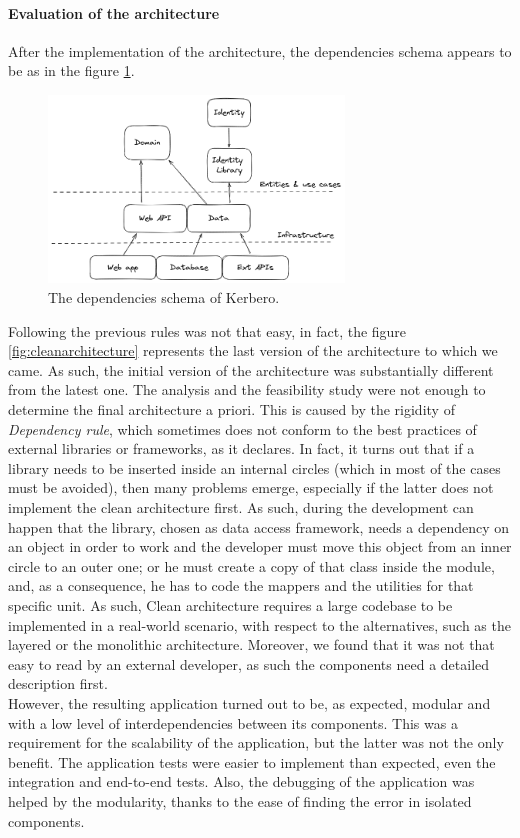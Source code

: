 \paragraph{Evaluation of the architecture}
After the implementation of the architecture, the dependencies schema appears to be as in the figure \ref{fig:dependenciesschema}. \\
\begin{figure}[ht]
    \centering
    \includegraphics[width=0.70\textwidth]{figures/dependenciesschema.excalidraw.png}
    \caption{The dependencies schema of Kerbero.}
    \label{fig:dependenciesschema}
\end{figure}
Following the previous rules was not that easy, in fact, the figure \ref{fig:cleanarchitecture} represents the last version of the architecture to which we came. As such, the initial version of the architecture was substantially different from the latest one. The analysis and the feasibility study were not enough to determine the final architecture a priori. This is caused by the rigidity of \textit{Dependency rule}, which sometimes does not conform to the best practices of external libraries or frameworks, as it declares. In fact, it turns out that if a library needs to be inserted inside an internal circles (which in most of the cases must be avoided), then many problems emerge, especially if the latter does not implement the clean architecture first. As such, during the development can happen that the library, chosen as data access framework, needs a dependency on an object in order to work and the developer must move this object from an inner circle to an outer one; or he must create a copy of that class inside the module, and, as a consequence, he has to code the mappers and the utilities for that specific unit. As such, Clean architecture requires a large codebase to be implemented in a real-world scenario, with respect to the alternatives, such as the layered or the monolithic architecture. Moreover, we found that it was not that easy to read by an external developer, as such the components need a detailed description first.
\\ However, the resulting application turned out to be, as expected, modular and with a low level of interdependencies between its components. This was a requirement for the scalability of the application, but the latter was not the only benefit. The application tests were easier to implement than expected, even the integration and end-to-end tests. Also, the debugging of the application was helped by the modularity, thanks to the ease of finding the error in isolated components. 

